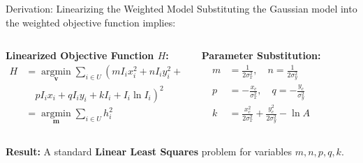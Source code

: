\begin{frame}{Derivation: Linearizing the Weighted Model}
    Substituting the Gaussian model into the weighted objective function implies:
    \vspace{0.5cm}
    \begin{columns}[T]
        \textbf{Linearized Objective Function $H$:}
        \scriptsize
        \begin{align*}
            H &= \operatorname*{argmin}_{\mathbf{v}} \sum_{i \in U} \left( 
            m I_i x_i^2 + n I_i y_i^2 + \right. \\
            &\quad \left. p I_i x_i + q I_i y_i + k I_i + I_i \ln I_i 
            \right)^2 \\
            &= \operatorname*{argmin}_{\mathbf{m}} \sum_{i \in U} h_i^2
        \end{align*}
        
        \textbf{Parameter Substitution:}
        \scriptsize
        \begin{align*}
            m &= \frac{1}{2\sigma_x^2}, \quad n = \frac{1}{2\sigma_y^2} \\
            p &= -\frac{x_c}{\sigma_x^2}, \quad q = -\frac{y_c}{\sigma_y^2} \\
            k &= \frac{x_c^2}{2\sigma_x^2} + \frac{y_c^2}{2\sigma_y^2} - \ln A
        \end{align*}
    \end{columns}
    
    \vspace{0.3cm}
    \textbf{Result:} A standard \textbf{Linear Least Squares} problem for variables $m,n,p,q,k$.
\end{frame}

